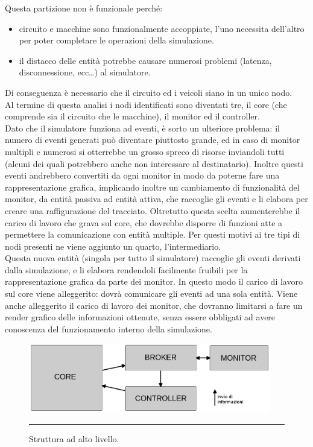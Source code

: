 Questa partizione non è funzionale perché:
\begin{itemize}
\item circuito e macchine sono funzionalmente accoppiate, l'uno necessita dell'altro per poter completare le operazioni della simulazione.
\item il distacco delle entità potrebbe causare numerosi problemi (latenza, disconnessione, ecc…) al simulatore. 
\end{itemize}
Di conseguenza è necessario che il circuito ed i veicoli siano in un unico nodo. \\
Al termine di questa analisi i nodi identificati sono diventati tre, il core (che comprende sia il circuito che le macchine), il monitor ed il controller. \\
Dato che il simulatore funziona ad eventi, è sorto un ulteriore problema: il numero di eventi generati può diventare piuttosto grande, ed in caso di monitor multipli e numerosi si otterrebbe un grosso spreco di risorse inviandoli tutti (alcuni dei quali potrebbero anche non interessare al destinatario). Inoltre questi eventi andrebbero convertiti da ogni monitor in modo da poterne fare una rappresentazione grafica, implicando inoltre un cambiamento di funzionalità del monitor, da entità passiva ad entità attiva, che raccoglie gli eventi e li elabora per creare una raffigurazione del tracciato.
Oltretutto questa scelta aumenterebbe il carico di lavoro che grava sul core, che dovrebbe disporre di funzioni atte a permettere la comunicazione con entità multiple.
Per questi motivi ai tre tipi di nodi presenti ne viene aggiunto un quarto, l’intermediario. \\
Questa nuova entità (singola per tutto il simulatore) raccoglie gli eventi derivati dalla simulazione, e li elabora rendendoli facilmente fruibili per la rappresentazione grafica da parte dei monitor. In questo modo il carico di lavoro sul core viene alleggerito: dovrà comunicare gli eventi ad una sola entità. Viene anche alleggerito il carico di lavoro dei monitor, che dovranno limitarsi a fare un render grafico delle informazioni ottenute, senza essere obbligati ad avere conoscenza del funzionamento interno della simulazione.
\\

\newpage
\begin{figure}[htbp]
	\centering
		\includegraphics[keepaspectratio = true, width = 400px] {Pictures/nodes}
		\rule{35em}{0.5pt}
	\caption[Struttura]{Struttura ad alto livello.}
	\label{fig:Struttura}
\end{figure}

